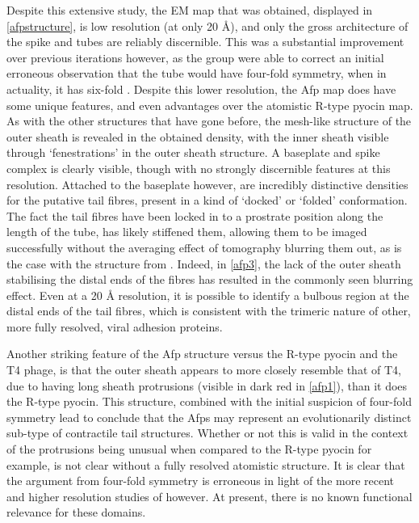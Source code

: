 \clearpage


Despite this extensive study, the EM map that was obtained, displayed in \vref{afpstructure}, is low resolution (at only 20 \AA), and only the gross architecture of the spike and tubes are reliably discernible. This was a substantial improvement over previous iterations however, as the group were able to correct an initial erroneous observation that the tube would have four-fold symmetry, when in actuality, it has six-fold \citep{Sen2010}. Despite this lower resolution, the Afp map does have some unique features, and even advantages over the atomistic R-type pyocin map. As with the other structures that have gone before, the mesh-like structure of the outer sheath is revealed in the obtained density, with the inner sheath visible through `fenestrations' in the outer sheath structure. A baseplate and spike complex is clearly visible, though with no strongly discernible features at this resolution. Attached to the baseplate however, are incredibly distinctive densities for the putative tail fibres, present in a kind of `docked' or `folded' conformation. The fact the tail fibres have been locked in to a prostrate position along the length of the tube, has likely stiffened them, allowing them to be imaged successfully without the averaging effect of tomography blurring them out, as is the case with the structure from \cite{Ge2015}. Indeed, in \vref{afp3}, the lack of the outer sheath stabilising the distal ends of the fibres has resulted in the commonly seen blurring effect. Even at a 20 \AA{} resolution, it is possible to identify a bulbous region at the distal ends of the tail fibres, which is consistent with the trimeric nature of other, more fully resolved, viral adhesion proteins.

Another striking feature of the Afp structure versus the R-type pyocin and the T4 phage, is that the outer sheath appears to more closely resemble that of T4, due to having long sheath protrusions (visible in dark red in \vref{afp1}), than it does the R-type pyocin. This structure, combined with the initial suspicion of four-fold symmetry lead \cite{Sen2010} to conclude that the Afps may represent an evolutionarily distinct sub-type of contractile tail structures. Whether or not this is valid in the context of the protrusions being unusual when compared to the R-type pyocin for example, is not clear without a fully resolved atomistic structure. It is clear that the argument from four-fold symmetry is erroneous in light of the more recent and higher resolution studies of \cite{Heymann2013} however. At present, there is no known functional relevance for these domains.
 
